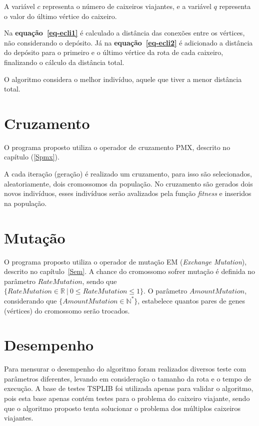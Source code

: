 \documentclass[12pt,openright,a4paper,twoside]{tcc}
\begin{document}
		A variável $c$ representa o número de caixeiros viajantes, e a variável $q$ representa o valor do último vértice do caixeiro.

		Na \textbf{equação~\ref{eq-ecli1}} é calculado a distância das conexões entre os vértices, não considerando o depósito. Já na \textbf{equação~\ref{eq-ecli2}} é adicionado a distância do depósito para o primeiro e o último vértice da rota de cada caixeiro, finalizando o cálculo da distância total.

		O algoritmo considera o melhor indivíduo, aquele que tiver a menor distância total. 

		\section{Cruzamento}

			O programa proposto utiliza o operador de cruzamento PMX, descrito no capítulo (\ref{Spmx}). 
			
			A cada iteração (geração) é realizado um cruzamento, para isso são selecionados, aleatoriamente, dois cromossomos da população. No cruzamento são gerados dois novos indivíduos, esses indivíduos serão avalizados pela função \textit{fitness} e inseridos na população.

		\section{Mutação}

			O programa proposto utiliza o operador de mutação EM (\textit{Exchange Mutation}), descrito no capítulo~\ref{Sem}. A chance do cromossomo sofrer mutação é definida no parâmetro $RateMutation$, sendo que $\{RateMutation \in \mathbb{R}~|~ 0 \leq RateMutation \leq 1\}$. O parâmetro  $AmountMutation$, considerando que  $\{AmountMutation \in \mathbb{N}^*\}$, estabelece quantos pares de genes (vértices) do cromossomo serão trocados.
						
		
			
		\section{Desempenho}
		
		Para mensurar o desempenho do algoritmo foram realizados diversos teste com parâmetros diferentes, levando em consideração o tamanho da rota e o tempo de execução. A base de testes TSPLIB foi utilizada apenas para validar o algoritmo, pois esta base apenas contém testes para o problema do caixeiro viajante, sendo que o algoritmo proposto tenta solucionar o problema dos múltiplos caixeiros viajantes. 
		
\end{document}
